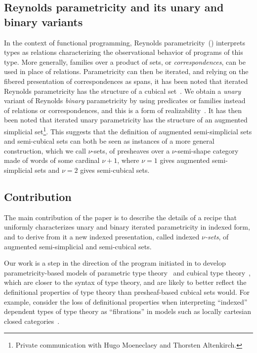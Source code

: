 \documentclass{msc}
\begin{document}
\subsection*{Reynolds parametricity and its unary and binary variants}
In the context of functional programming, Reynolds parametricity~(\citeyear{reynolds83}) interprets types as relations characterizing the observational behavior of programs of this type. More generally, families over a product of sets, or \emph{correspondences}, can be used in place of relations. Parametricity can then be iterated, and relying on the fibered presentation of correspondences as spans, it has been noted that iterated Reynolds parametricity has the structure of a cubical set~\citep{altenkirch15,moulin16,johann17,moeneclaey21,moeneclaey22phd}. We obtain a \emph{unary} variant of Reynolds \emph{binary} parametricity by using predicates or families instead of relations or correspondences, and this is a form of realizability~\citep{bernardy12,lasson12,moulin16}. It has then been noted that iterated unary parametricity has the structure of an augmented simplicial set\footnote{Private communication with Hugo Moeneclaey and Thorsten Altenkirch.}. This suggests that the definition of augmented semi-simplicial sets and semi-cubical sets can both be seen as instances of a more general construction, which we call $\nu$-sets, of presheaves over a $\nu$-semi-shape category made of words of some cardinal $\nu+1$, where $\nu=1$ gives augmented semi-simplicial sets and $\nu=2$ gives semi-cubical sets.

\subsection*{Contribution}
The main contribution of the paper is to describe the details of a recipe that uniformly characterizes unary and binary iterated parametricity in indexed form, and to derive from it a new indexed presentation, called indexed \emph{$\nu$-sets}, of augmented semi-simplicial and semi-cubical sets.

Our work is a step in the direction of the program initiated in \cite{altenkirch15} to develop parametricity-based models of parametric type theory~\citep{bernardy15,nuyts17,cavallo19} and cubical type theory~\citep{bezem13,cohen16,angiuli21}, which are closer to the syntax of type theory, and are likely to better reflect the definitional properties of type theory than presheaf-based cubical sets would. For example, consider the loss of definitional properties when interpreting ``indexed'' dependent types of type theory as ``fibrations'' in models such as locally cartesian closed categories~\citep{curien14}.
\end{document}
